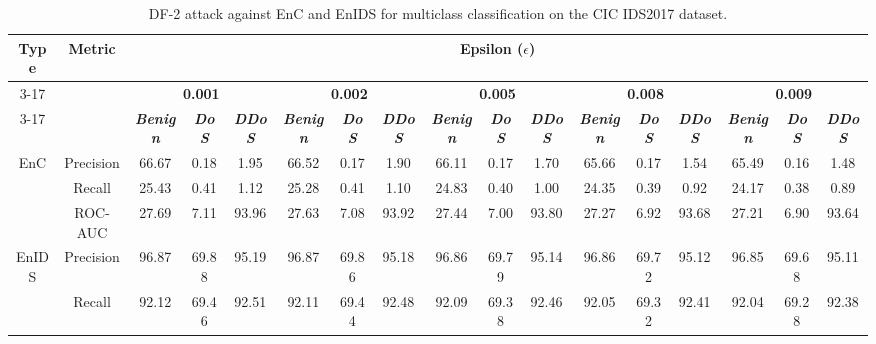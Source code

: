 \documentclass[conference]{IEEEtran}
\begin{document}
	
	\begin{table}[H]
		\caption{DF-2 attack against EnC and EnIDS for multiclass classification on the CIC IDS2017 dataset.}
		\small
		\setlength{\tabcolsep}{1pt}
		\centering
		\label{tab:cic_multi_df}
		\hspace*{-2.3cm}
		
		\begin{tabular}{|c|c|c|c|c|c|c|c|c|c|c|c|c|c|c|c|c|}
			\hline
			\multirow{4}{*}{\textbf{Type}} & \multirow{4}{*}{\textbf{Metric}}& \multicolumn{15}{c|}{\textbf{Epsilon ($\epsilon$)}} \\
			\cline{3-17}
			&  & \multicolumn{3}{c|}{\textbf{0.001}} & \multicolumn{3}{c|}{\textbf{0.002}} & \multicolumn{3}{c|}{\textbf{0.005}} & \multicolumn{3}{c|}{\textbf{0.008}} & \multicolumn{3}{c|}{\textbf{0.009}}  \\
			\cline{3-17}
			&  & \textbf{\textsl{Benign}} & \textbf{\textsl{DoS}} & \textbf{\textsl{DDoS}} & \textbf{\textsl{Benign}} & \textbf{\textsl{DoS}} & \textbf{\textsl{DDoS}} & \textbf{\textsl{Benign}} & \textbf{\textsl{DoS}} & \textbf{\textsl{DDoS}} & \textbf{\textsl{Benign}} & \textbf{\textsl{DoS}} & \textbf{\textsl{DDoS}} & \textbf{\textsl{Benign}} & \textbf{\textsl{DoS}} & \textbf{\textsl{DDoS}} \\
			\hline
			\multirow{3}{*}{EnC} & Precision & 66.67 & 0.18 & 1.95 & 66.52 & 0.17 & 1.90 & 66.11 & 0.17 & 1.70 & 65.66 & 0.17 & 1.54 & 65.49 & 0.16 & 1.48
			\\
			
			& Recall & 25.43 & 0.41 & 1.12 & 25.28 & 0.41 & 1.10 & 24.83 & 0.40 & 1.00 & 24.35 & 0.39 & 0.92 & 24.17 & 0.38 & 0.89
			\\
			
			& ROC-AUC & 27.69 & 7.11 & 93.96 & 27.63 & 7.08 & 93.92 & 27.44 & 7.00 & 93.80 & 27.27 & 6.92 & 93.68 & 27.21 & 6.90 & 93.64
			\\
			\hline
			\multirow{3}{*}{EnIDS} & Precision & \cellcolor{yellow!50}96.87 & \cellcolor{yellow!50}69.88 & \cellcolor{yellow!50}95.19 & \cellcolor{yellow!50}96.87 & \cellcolor{yellow!50}69.86 & \cellcolor{yellow!50}95.18 & \cellcolor{yellow!50}96.86 & \cellcolor{yellow!50}69.79 & \cellcolor{yellow!50}95.14 & \cellcolor{yellow!50}96.86 & \cellcolor{yellow!50}69.72 & \cellcolor{yellow!50}95.12 & \cellcolor{yellow!50}96.85 & \cellcolor{yellow!50}69.68 & \cellcolor{yellow!50}95.11
			\\
			
			& Recall & \cellcolor{yellow!50}92.12 & \cellcolor{yellow!50}69.46 & \cellcolor{yellow!50}92.51 & \cellcolor{yellow!50}92.11 & \cellcolor{yellow!50}69.44 & \cellcolor{yellow!50}92.48 & \cellcolor{yellow!50}92.09 & \cellcolor{yellow!50}69.38 & \cellcolor{yellow!50}92.46 & \cellcolor{yellow!50}92.05 & \cellcolor{yellow!50}69.32 & \cellcolor{yellow!50}92.41 & \cellcolor{yellow!50}92.04 & \cellcolor{yellow!50}69.28 & \cellcolor{yellow!50}92.38
			\\
			

\end{tabular}
\end{table}
\end{document}

